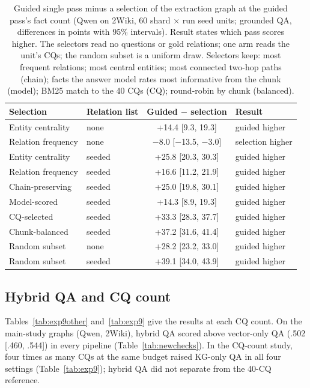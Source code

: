\begin{table}[!htb]
\centering
\caption{Guided single pass minus a selection of the extraction graph at the guided pass's fact count (Qwen on 2Wiki, 60 shard $\times$ run seed units; grounded QA, differences in points with 95\% intervals). Result states which pass scores higher. The selectors read no questions or gold relations; one arm reads the unit's CQs; the random subset is a uniform draw. Selectors keep: most frequent relations; most central entities; most connected two-hop paths (chain); facts the answer model rates most informative from the chunk (model); BM25 match to the 40 CQs (CQ); round-robin by chunk (balanced).}
\label{tab:selection}
\scriptsize\setlength{\tabcolsep}{3pt}
\begin{tabular}{llcl}
\toprule
Selection & Relation list & Guided $-$ selection & Result \\
\midrule
Entity centrality & none & +14.4 [9.3, 19.3] & guided higher \\
Relation frequency & none & $-$8.0 [$-$13.5, $-$3.0] & selection higher \\
Entity centrality & seeded & +25.8 [20.3, 30.3] & guided higher \\
Relation frequency & seeded & +16.6 [11.2, 21.9] & guided higher \\
Chain-preserving & seeded & +25.0 [19.8, 30.1] & guided higher \\
Model-scored & seeded & +14.3 [8.9, 19.3] & guided higher \\
CQ-selected & seeded & +33.3 [28.3, 37.7] & guided higher \\
Chunk-balanced & seeded & +37.2 [31.6, 41.4] & guided higher \\
Random subset & none & +28.2 [23.2, 33.0] & guided higher \\
Random subset & seeded & +39.1 [34.0, 43.9] & guided higher \\
\bottomrule
\end{tabular}
\end{table}

\subsection{Hybrid QA and CQ count}
\label{sec:res-hybrid}
Tables~\ref{tab:exp9other} and~\ref{tab:exp9} give the results at each CQ count. On the main-study graphs (Qwen, 2Wiki), hybrid QA scored above vector-only QA (.502 [.460, .544]) in every pipeline (Table~\ref{tab:newchecks}). In the CQ-count study, four times as many CQs at the same budget raised KG-only QA in all four settings (Table~\ref{tab:exp9}); hybrid QA did not separate from the 40-CQ reference.



